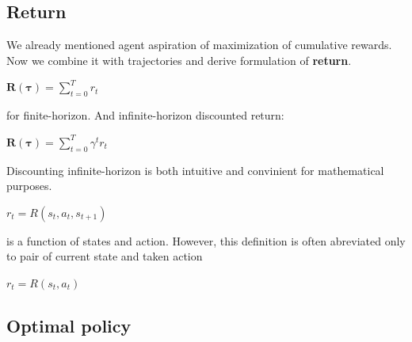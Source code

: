 \subsection*{Return}
We already mentioned agent aspiration of maximization of cumulative rewards.
Now we combine it with trajectories and derive formulation of \textbf{return}.
\begin{center}
$\bm{R(\tau)} = \sum_{t=0}^{T}r_t$
\end{center}
 for finite-horizon.
And infinite-horizon discounted return:
\begin{center}
    $\bm{R(\tau)} = \sum_{t=0}^{T}\gamma^t r_t$
\end{center}
Discounting infinite-horizon is both intuitive and convinient for mathematical purposes.

\begin{center}$r_t = R(s_t, a_t, s_{t+1})$\end{center} is a function of states and action. 
However, this definition is often abreviated only to pair of current state and taken action 
\begin{center}$r_t = R(s_t, a_t)$\end{center}


\subsection*{Optimal policy}

